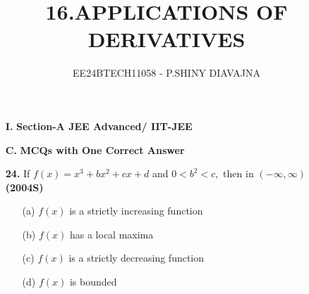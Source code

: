 \documentclass[journal,12pt,twocolumn]{IEEEtran}
\theoremstyle{remark}
\begin{document}

\vspace{3cm}

\title{16.APPLICATIONS OF DERIVATIVES}
\author{EE24BTECH11058 - P.SHINY DIAVAJNA}

\maketitle
\newpage
\bigskip


\renewcommand{\thefigure}{\theenumi}
\renewcommand{\thetable}{\theenumi}

 \begin{enumerate}
  \item[\textbf{I.} ]\textbf{Section-A JEE Advanced/ IIT-JEE}\\
 \end{enumerate} 
   \begin{enumerate}
  \item[\textbf{C.}] \textbf{MCQs with One Correct Answer}\\
   \end{enumerate}
    \begin{enumerate} 
     \item[\textbf{24.}]If $f(x)=x^3+bx^2+cx+d$ and $0<b^2<c,$ then in $(-\infty,\infty)$ \hfill{\textbf{(2004S)}}
     \begin{enumerate}
         \item[(a)] $f(x)$ is a strictly increasing function
         \item[(b)] $f(x)$ has a local maxima
         \item[(c)] $f(x)$ is a strictly decreasing function
         \item[(d)] $f(x)$ is bounded  \\
     \end{enumerate}
    \end{enumerate}
\end{document}
